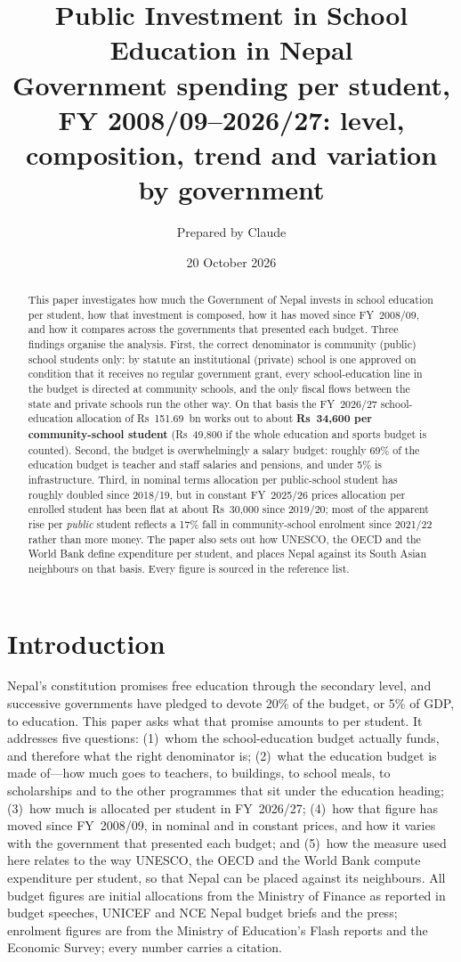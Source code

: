 \documentclass[11pt,a4paper]{article}
\title{\textbf{Public Investment in School Education in Nepal}\\[4pt]\large Government spending per student, FY 2008/09--2026/27: level, composition, trend and variation by government}
\author{Prepared by Claude}
\date{20 October 2026}
\begin{document}
\maketitle

\begin{abstract}
\noindent This paper investigates how much the Government of Nepal invests in school education per student, how that investment is composed, how it has moved since FY~2008/09, and how it compares across the governments that presented each budget. Three findings organise the analysis. First, the correct denominator is community (public) school students only: by statute an institutional (private) school is one approved on condition that it receives no regular government grant, every school-education line in the budget is directed at community schools, and the only fiscal flows between the state and private schools run the other way. On that basis the FY~2026/27 school-education allocation of Rs~151.69~bn works out to about \textbf{Rs~34,600 per community-school student} (Rs~49,800 if the whole education and sports budget is counted). Second, the budget is overwhelmingly a salary budget: roughly 69\% of the education budget is teacher and staff salaries and pensions, and under 5\% is infrastructure. Third, in nominal terms allocation per public-school student has roughly doubled since 2018/19, but in constant FY~2025/26 prices allocation per enrolled student has been flat at about Rs~30,000 since 2019/20; most of the apparent rise per \emph{public} student reflects a 17\% fall in community-school enrolment since 2021/22 rather than more money. The paper also sets out how UNESCO, the OECD and the World Bank define expenditure per student, and places Nepal against its South Asian neighbours on that basis. Every figure is sourced in the reference list.
\end{abstract}

\section{Introduction}
Nepal's constitution promises free education through the secondary level, and successive governments have pledged to devote 20\% of the budget, or 5\% of GDP, to education. This paper asks what that promise amounts to per student. It addresses five questions: (1)~whom the school-education budget actually funds, and therefore what the right denominator is; (2)~what the education budget is made of---how much goes to teachers, to buildings, to school meals, to scholarships and to the other programmes that sit under the education heading; (3)~how much is allocated per student in FY~2026/27; (4)~how that figure has moved since FY~2008/09, in nominal and in constant prices, and how it varies with the government that presented each budget; and (5)~how the measure used here relates to the way UNESCO, the OECD and the World Bank compute expenditure per student, so that Nepal can be placed against its neighbours. All budget figures are initial allocations from the Ministry of Finance as reported in budget speeches, UNICEF and NCE Nepal budget briefs and the press; enrolment figures are from the Ministry of Education's Flash reports and the Economic Survey; every number carries a citation.
\end{document}
